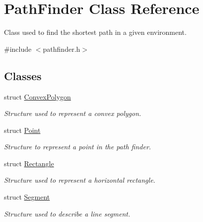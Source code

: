 \hypertarget{classPathFinder}{
\section{PathFinder Class Reference}
\label{classPathFinder}
}


Class used to find the shortest path in a given environment.  




{\ttfamily \#include $<$pathfinder.h$>$}

\subsection*{Classes}
\begin{DoxyCompactItemize}
\item 
struct \hyperlink{structPathFinder_1_1ConvexPolygon}{ConvexPolygon}
\begin{DoxyCompactList}\small\item\em Structure used to represent a convex polygon. \item\end{DoxyCompactList}\item 
struct \hyperlink{structPathFinder_1_1Point}{Point}
\begin{DoxyCompactList}\small\item\em Structure to represent a point in the path finder. \item\end{DoxyCompactList}\item 
struct \hyperlink{structPathFinder_1_1Rectangle}{Rectangle}
\begin{DoxyCompactList}\small\item\em Structure used to represent a horizontal rectangle. \item\end{DoxyCompactList}\item 
struct \hyperlink{structPathFinder_1_1Segment}{Segment}
\begin{DoxyCompactList}\small\item\em Structure used to describe a line segment. \item\end{DoxyCompactList}\end{DoxyCompactItemize}
